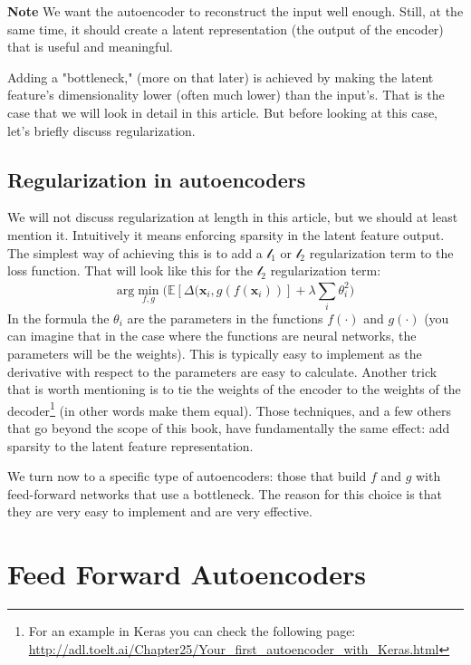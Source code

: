 \documentclass[12pt,a4]{article}
\newenvironment{note}
{\begin{mdframed}[backgroundcolor=light-gray, roundcorner=10pt,leftmargin=1, rightmargin=1, innerleftmargin=15, innertopmargin=15,innerbottommargin=15, outerlinewidth=1, linecolor=light-gray]}
{\end{mdframed}}
\begin{document}
\begin{note}
\textbf{Note} We want the autoencoder to reconstruct the input well enough. Still, at the same time, it should create a latent representation (the output of the encoder) that is useful and meaningful.
\end{note}
Adding a "bottleneck," (more on that later) is achieved by making the latent feature's dimensionality lower (often much lower) than the input's. That is the case that we will look in detail in this article. But before looking at this case, let’s briefly discuss regularization.


\subsection{Regularization in autoencoders}

We will not discuss regularization at length in this article, but we should at least mention it. Intuitively it means enforcing sparsity in the latent feature output. The simplest way of achieving this is to add a \(\mathcal{l}_{1}\) or \(\mathcal{l}_{2}\) regularization term to the loss function. That will look like this for the \(\mathcal{l}_{2}\) regularization term:
\begin{equation}
\textrm{arg}\min_{f,g}\mathbb{(E}\left[\Delta (\mathbf{x}_{i}, g(f\left(\mathbf{x}_{i}\right))\right]+\lambda \sum_{i}^{}\theta_{i}^{2})
\end{equation}
In the formula the \( \theta_{i}\) are the parameters in the functions \( f(\cdot)\) and \( g(\cdot)\) (you can imagine that in the case where the functions are neural networks, the parameters will be the weights). This is typically easy to implement as the derivative with respect to the parameters are easy to calculate. Another trick that is worth mentioning is to tie the weights of the encoder to the weights of the decoder\footnote{ For an example in Keras you can check the following page: \url{http://adl.toelt.ai/Chapter25/Your_first_autoencoder_with_Keras.html} } (in other words make them equal). Those techniques, and a few others that go beyond the scope of this book, have fundamentally the same effect: add sparsity to the latent feature representation.

We turn now to a specific type of autoencoders: those that build \( f\) and \( g\) with feed-forward networks that use a bottleneck. The reason for this choice is that they are very easy to implement and are very effective.

\section{Feed Forward Autoencoders}
\end{document}
